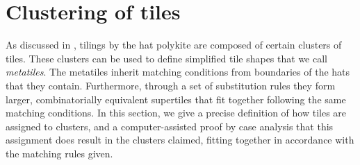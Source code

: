 \section{Clustering of tiles}
\label{sec:clusters}

As discussed in , tilings by the hat polykite
are composed of certain clusters of tiles.  These clusters can be 
used to define simplified tile shapes that we call \textit{metatiles}.
The metatiles inherit matching conditions from boundaries of the hats
that they contain. Furthermore, through a set of substitution rules 
they form larger, combinatorially equivalent
supertiles that fit together following the same matching conditions.  In
this section, we give a precise definition of how tiles are assigned
to clusters, and a computer-assisted proof by case analysis that
this assignment does result in the clusters claimed, fitting together
in accordance with the matching rules given.  

